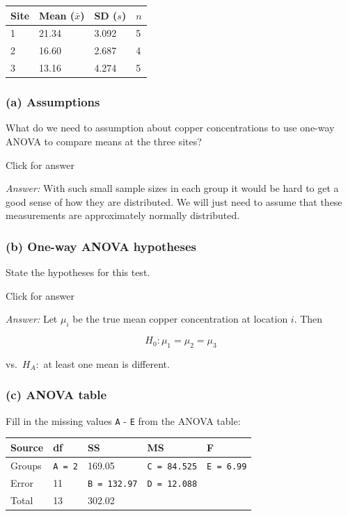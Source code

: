 \documentclass[
]{book}
\begin{document}
\begin{longtable}[]{@{}llll@{}}
\toprule()
Site & Mean (\(\bar{x}\)) & SD (\(s\)) & \(n\) \\
\midrule()
\endhead
1 & 21.34 & 3.092 & 5 \\
2 & 16.60 & 2.687 & 4 \\
3 & 13.16 & 4.274 & 5 \\
\bottomrule()
\end{longtable}

\hypertarget{a-assumptions}{%
\subsubsection{(a) Assumptions}\label{a-assumptions}}

What do we need to assumption about copper concentrations to use one-way ANOVA to compare means at the three sites?

Click for answer

\emph{Answer:} With such small sample sizes in each group it would be hard to get a good sense of how they are distributed. We will just need to assume that these measurements are approximately normally distributed.

\hypertarget{b-one-way-anova-hypotheses}{%
\subsubsection{(b) One-way ANOVA hypotheses}\label{b-one-way-anova-hypotheses}}

State the hypotheses for this test.

Click for answer

\emph{Answer:} Let \(\mu_i\) be the true mean copper concentration at location \(i\). Then

\[
H_0: \mu_{1} = \mu_{2} = \mu_{3} 
\]

vs.~\(H_A:\) at least one mean is different.

\hypertarget{c-anova-table}{%
\subsubsection{(c) ANOVA table}\label{c-anova-table}}

Fill in the missing values \texttt{A} - \texttt{E} from the ANOVA table:

\begin{longtable}[]{@{}lllll@{}}
\toprule()
Source & df & SS & MS & F \\
\midrule()
\endhead
Groups & \texttt{A\ =\ 2} & 169.05 & \texttt{C\ =\ 84.525} & \texttt{E\ =\ 6.99} \\
Error & 11 & \texttt{B\ =\ 132.97} & \texttt{D\ =\ 12.088} & \\
Total & 13 & 302.02 & & \\
\bottomrule()
\end{longtable}
\end{document}

